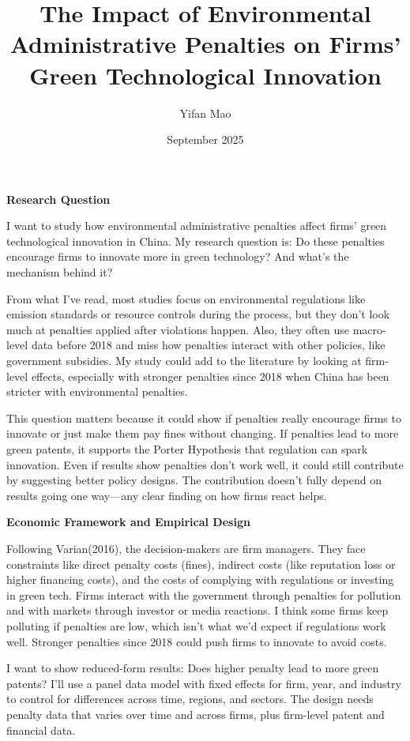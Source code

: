 \documentclass[12pt]{article}
\title{The Impact of Environmental Administrative Penalties on Firms' Green Technological Innovation}
\author{Yifan Mao}
\date{September 2025}
\begin{document}
\pagecolor[rgb]{0.80,0.91,0.81} 
\maketitle

\textbf{Research Question}

I want to study how environmental administrative penalties affect firms’ green technological innovation in China. My research question is: Do these penalties encourage firms to innovate more in green technology? And what’s the mechanism behind it?

From what I’ve read, most studies focus on environmental regulations like emission standards or resource controls during the process, but they don’t look much at penalties applied after violations happen. Also, they often use macro-level data before 2018 and miss how penalties interact with other policies, like government subsidies. My study could add to the literature by looking at firm-level effects, especially with stronger penalties since 2018 when China has been stricter with environmental penalties.

This question matters because it could show if penalties really encourage firms to innovate or just make them pay fines without changing. If penalties lead to more green patents, it supports the Porter Hypothesis that regulation can spark innovation. Even if results show penalties don’t work well, it could still contribute by suggesting better policy designs. The contribution doesn’t fully depend on results going one way—any clear finding on how firms react helps.

\textbf{Economic Framework and Empirical Design}

Following Varian(2016), the decision-makers are firm managers. They face constraints like direct penalty costs (fines), indirect costs (like reputation loss or higher financing costs), and the costs of complying with regulations or investing in green tech. Firms interact with the government through penalties for pollution and with markets through investor or media reactions. I think some firms keep polluting if penalties are low, which isn’t what we’d expect if regulations work well. Stronger penalties since 2018 could push firms to innovate to avoid costs.

I want to show reduced-form results: Does higher penalty lead to more green patents? I’ll use a panel data model with fixed effects for firm, year, and industry to control for differences across time, regions, and sectors. The design needs penalty data that varies over time and across firms, plus firm-level patent and financial data.
\end{document}
